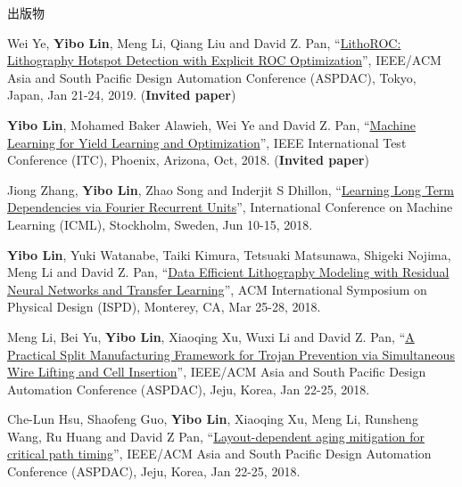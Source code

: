 \begin{rSection}{出版物}
\begin{description}[font=\normalfont]
{}
            

\item[{[C19]}]{
        Wei Ye, \textbf{Yibo Lin}, Meng Li, Qiang Liu and David Z. Pan, 
    ``\href{https://doi.org/10.1145/3287624.3288746}{LithoROC: Lithography Hotspot Detection with Explicit ROC Optimization}'', 
    IEEE/ACM Asia and South Pacific Design Automation Conference (ASPDAC), Tokyo, Japan, Jan 21-24, 2019.
    (\textbf{Invited paper})
}
            

\item[{[C18]}]{
        \textbf{Yibo Lin}, Mohamed Baker Alawieh, Wei Ye and David Z. Pan, 
    ``\href{https://doi.org/10.1109/TEST.2018.8624733}{Machine Learning for Yield Learning and Optimization}'', 
    IEEE International Test Conference (ITC), Phoenix, Arizona, Oct, 2018.
    (\textbf{Invited paper})
}
            

\item[{[C17]}]{
        Jiong Zhang, \textbf{Yibo Lin}, Zhao Song and Inderjit S Dhillon, 
    ``\href{https://arxiv.org/pdf/1803.06585.pdf}{Learning Long Term Dependencies via Fourier Recurrent Units}'', 
    International Conference on Machine Learning (ICML), Stockholm, Sweden, Jun 10-15, 2018.
    
}
            

\item[{[C16]}]{
        \textbf{Yibo Lin}, Yuki Watanabe, Taiki Kimura, Tetsuaki Matsunawa, Shigeki Nojima, Meng Li and David Z. Pan, 
    ``\href{https://doi.org/10.1145/3177540.3178242}{Data Efficient Lithography Modeling with Residual Neural Networks and Transfer Learning}'', 
    ACM International Symposium on Physical Design (ISPD), Monterey, CA, Mar 25-28, 2018.
    
}
            

\item[{[C15]}]{
        Meng Li, Bei Yu, \textbf{Yibo Lin}, Xiaoqing Xu, Wuxi Li and David Z. Pan, 
    ``\href{https://doi.org/10.1109/ASPDAC.2018.8297316}{A Practical Split Manufacturing Framework for Trojan Prevention via Simultaneous Wire Lifting and Cell Insertion}'', 
    IEEE/ACM Asia and South Pacific Design Automation Conference (ASPDAC), Jeju, Korea, Jan 22-25, 2018.
    
}
            

\item[{[C14]}]{
        Che-Lun Hsu, Shaofeng Guo, \textbf{Yibo Lin}, Xiaoqing Xu, Meng Li, Runsheng Wang, Ru Huang and David Z Pan, 
    ``\href{https://doi.org/10.1109/ASPDAC.2018.8297298}{Layout-dependent aging mitigation for critical path timing}'', 
    IEEE/ACM Asia and South Pacific Design Automation Conference (ASPDAC), Jeju, Korea, Jan 22-25, 2018.
    
}
\end{description}
\end{rSection}
